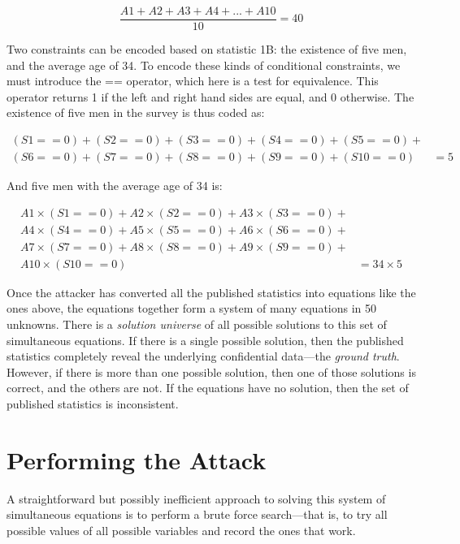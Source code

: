 \documentclass[runningheads]{llncs}
\begin{document}
\begin{equation}\label{eq1}
\frac{A1 + A2 + A3 + A4 +...+ A10}{10} = 40
\end{equation}

Two constraints can be encoded based on statistic 1B: the existence of
five men, and the average age of 34. To encode these kinds of
conditional constraints, we must introduce the == operator,
which here is a test for equivalence. This operator returns 1 if the
left and right hand sides are equal, and 0 otherwise.
The existence of five men in the survey is thus coded as:

\begin{equation}
\begin{split}
(S1==0) + (S2==0) + (S3==0) + (S4==0) + (S5==0) +  & \\
(S6==0) + (S7==0) + (S8==0) + (S9==0) + (S10==0) & = 5
\end{split}
\end{equation}

And five men with the average age of 34 is:

\begin{equation}
\begin{split}
A1\times(S1==0) + A2\times(S2==0) + A3\times(S3==0) + &\\
A4\times(S4==0) + A5\times(S5==0) + A6\times(S6==0) + &\\
A7\times(S7==0) + A8\times(S8==0) + A9\times(S9==0) + &\\
                                    A10\times(S10==0) & = 34\times5
\end{split}
\end{equation}

Once the attacker has converted all the published statistics
into equations like the ones above, the equations together form a
system of many equations in 50 unknowns.
There is a \textit{solution universe} of all possible solutions to
this set of simultaneous equations. If there is a single possible
solution, then the published statistics completely reveal the
underlying confidential data---the \emph{ground truth}. However, if
there is more than one possible solution, then one of those solutions
is correct, and the others are not. If the equations have no solution,
then the set of published statistics is inconsistent.

\section{Performing the Attack}
A straightforward but possibly inefficient approach to solving this
system of simultaneous equations is to perform a brute force
search---that is, to try all possible values of all possible variables
and record the ones that work.
\end{document}
